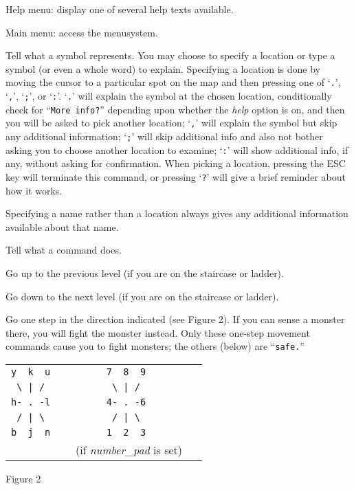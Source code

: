\item[\tb{?}]
Help menu:  display one of several help texts available.

\item[\tb{`}]
Main menu:  access the menusystem.

\item[\tb{/}]
Tell what a symbol represents.  You may choose to specify a location
or type a symbol (or even a whole word) to explain.
Specifying a location is done by moving the cursor to a particular spot
on the map and then pressing one of `{\tt .}', `{\tt ,}', `{\tt ;}',
or `{\tt :}'.  `{\tt .}' will explain the symbol at the chosen location,
conditionally check for ``{\tt More info?}'' depending upon whether the
{\it help\/} 
option is on, and then you will be asked to pick another location;
`{\tt ,}' will explain the symbol but skip any additional
information; `{\tt ;}' will skip additional info and also not bother asking
you to choose another location to examine; `{\tt :}' will show additional
info, if any, without asking for confirmation.  When picking a location,
pressing the ESC key will terminate this command, or pressing `{\tt ?}'
will give a brief reminder about how it works.

Specifying a name rather than a location
always gives any additional information available about that name.

\item[\tb{\&}]
Tell what a command does.

\item[\tb{<}]
Go up to the previous level (if you are on the staircase or ladder).

\item[\tb{>}]
Go down to the next level (if you are on the staircase or ladder).

\item[\tb{[yuhjklbn]}]
Go one step in the direction indicated (see Figure 2).  If you can sense
a monster there, you will fight the monster instead.  Only these
one-step movement commands cause you to fight monsters; the others
(below) are ``{\tt safe.}''
\begin{center}
\begin{tabular}{cc}
\verb+y  k  u+ & \verb+        7  8  9         +\\
\verb+ \ | / + & \verb+         \ | /          +\\
\verb+h- . -l+ & \verb+        4- . -6         +\\
\verb+ / | \ + & \verb+         / | \          +\\
\verb+b  j  n+ & \verb+        1  2  3         +\\
               & (if {\it number\_pad\/} is set)
\end{tabular}
\end{center}
\begin{center}
Figure 2
\end{center}

